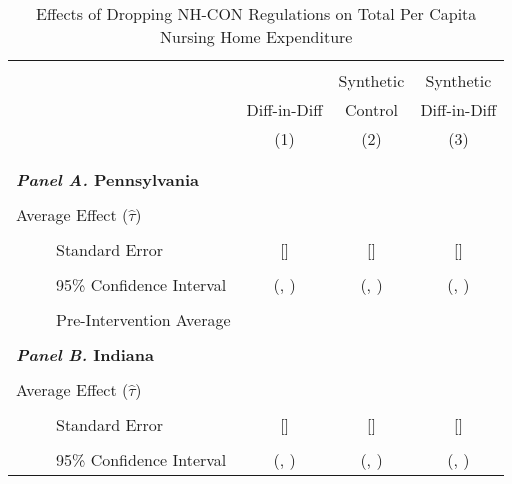 \documentclass[../Main.tex]{subfiles}
\begin{document}
\newpage
\null
\vfill
\begin{table}[htbp]\centering \footnotesize
\def\sym#1{\ifmmode^{#1}\else\(^{#1}\)\fi}
\captionsetup{width=.69\textwidth}
\caption{\centering Effects of Dropping NH-CON Regulations on Total Per Capita Nursing Home Expenditure}
\label{tab:ave_results_tot_exp}
\setlength{\tabcolsep}{10pt}
\begin{tabular}{l*{3}{c}}
\hline\hline
\\[-2ex]
&\multicolumn{1}{c}{}&\multicolumn{1}{c}{Synthetic}&\multicolumn{1}{c}{Synthetic}\\
&\multicolumn{1}{c}{Diff-in-Diff}&\multicolumn{1}{c}{Control}&\multicolumn{1}{c}{Diff-in-Diff}\\
&\multicolumn{1}{c}{(1)}&\multicolumn{1}{c}{(2)}&\multicolumn{1}{c}{(3)}\\
\\[-2ex]
\hline
\\[-.1ex]
\multicolumn{4}{l}{\textbf{\textit{Panel A.} Pennsylvania}}\\
\\[-1.5ex]
\multicolumn{1}{l}{Average Effect ($\hat{\tau}$)}&   \multicolumn{1}{c}{}&   \multicolumn{1}{c}{}&  \multicolumn{1}{c}{}\\
\\[-2ex]
\multicolumn{1}{l}{\ \ \ \ \ Standard Error}  &\multicolumn{1}{c}{[]}&\multicolumn{1}{c}{[]}&\multicolumn{1}{c}{[]}\\
\\[-2ex]
\multicolumn{1}{l}{\ \ \ \ \ 95\% Confidence Interval}&   \multicolumn{1}{c}{(, )}&   \multicolumn{1}{c}{(, )}&   \multicolumn{1}{c}{(, )}\\
\\[-2ex]
\multicolumn{1}{l}{\ \ \ \ \ Pre-Intervention Average}&   \multicolumn{3}{c}{}\\
\\[-.1ex]
\multicolumn{4}{l}{\textbf{\textit{Panel B.} Indiana}}\\
\\[-1.5ex]
\multicolumn{1}{l}{Average Effect ($\hat{\tau}$)}&   \multicolumn{1}{c}{}&   \multicolumn{1}{c}{}&  \multicolumn{1}{c}{}\\
\\[-2ex]
\multicolumn{1}{l}{\ \ \ \ \ Standard Error}  &\multicolumn{1}{c}{[]}&\multicolumn{1}{c}{[]}&\multicolumn{1}{c}{[]}\\
\\[-2ex]
\multicolumn{1}{l}{\ \ \ \ \ 95\% Confidence Interval}&   \multicolumn{1}{c}{(, )}&   \multicolumn{1}{c}{(, )}&   \multicolumn{1}{c}{(, )}\\

\end{tabular}
\end{table}
\end{document}
